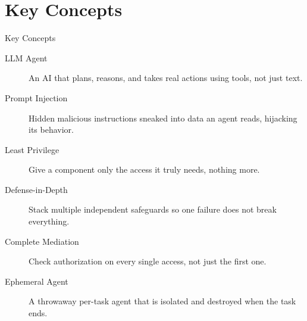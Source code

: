 \documentclass[10pt]{beamer}
\begin{document}
\section{Key Concepts}
\begin{frame}[allowframebreaks]{Key Concepts}
  \begin{description}
    \item[LLM Agent] An AI that plans, reasons, and takes real actions using tools, not just text.
    \item[Prompt Injection] Hidden malicious instructions sneaked into data an agent reads, hijacking its behavior.
    \item[Least Privilege] Give a component only the access it truly needs, nothing more.
    \item[Defense-in-Depth] Stack multiple independent safeguards so one failure does not break everything.
    \item[Complete Mediation] Check authorization on every single access, not just the first one.
    \item[Ephemeral Agent] A throwaway per-task agent that is isolated and destroyed when the task ends.
  \end{description}
\end{frame}
\end{document}
